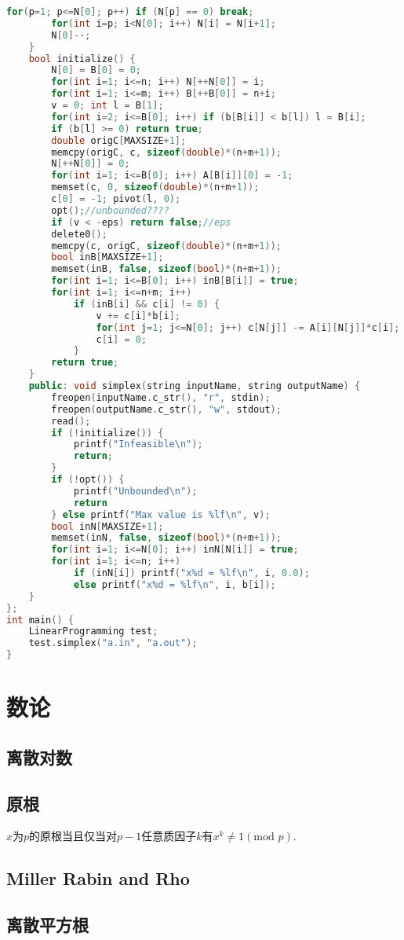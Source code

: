 \documentclass[landscape,a4paper]{article}
\begin{document}
\begin{spacing}{0.3}
\begin{multicols}{2}
\begin{lstlisting}[language=C++]
		for(p=1; p<=N[0]; p++) if (N[p] == 0) break;
		for(int i=p; i<N[0]; i++) N[i] = N[i+1];
		N[0]--;
	}
	bool initialize() {
		N[0] = B[0] = 0;
		for(int i=1; i<=n; i++) N[++N[0]] = i;
		for(int i=1; i<=m; i++) B[++B[0]] = n+i;
		v = 0; int l = B[1];
		for(int i=2; i<=B[0]; i++) if (b[B[i]] < b[l]) l = B[i];
		if (b[l] >= 0) return true;
		double origC[MAXSIZE+1];
		memcpy(origC, c, sizeof(double)*(n+m+1));
		N[++N[0]] = 0;
		for(int i=1; i<=B[0]; i++) A[B[i]][0] = -1;
		memset(c, 0, sizeof(double)*(n+m+1));
		c[0] = -1; pivot(l, 0);
		opt();//unbounded????
		if (v < -eps) return false;//eps
		delete0();
		memcpy(c, origC, sizeof(double)*(n+m+1));
		bool inB[MAXSIZE+1];
		memset(inB, false, sizeof(bool)*(n+m+1));
		for(int i=1; i<=B[0]; i++) inB[B[i]] = true;
		for(int i=1; i<=n+m; i++)
			if (inB[i] && c[i] != 0) {
				v += c[i]*b[i];
				for(int j=1; j<=N[0]; j++) c[N[j]] -= A[i][N[j]]*c[i];
				c[i] = 0;
			}
		return true;
	}
	public: void simplex(string inputName, string outputName) {
		freopen(inputName.c_str(), "r", stdin);
		freopen(outputName.c_str(), "w", stdout);
		read();
		if (!initialize()) {
			printf("Infeasible\n");
			return;
		}
		if (!opt()) {
			printf("Unbounded\n");
			return
		} else printf("Max value is %lf\n", v);
		bool inN[MAXSIZE+1];
		memset(inN, false, sizeof(bool)*(n+m+1));
		for(int i=1; i<=N[0]; i++) inN[N[i]] = true;
		for(int i=1; i<=n; i++)
			if (inN[i]) printf("x%d = %lf\n", i, 0.0);
			else printf("x%d = %lf\n", i, b[i]);
	}
};
int main() {
	LinearProgramming test;
	test.simplex("a.in", "a.out");
}
\end{lstlisting}	
	
	\section{数论}
	\subsection{离散对数}
	
	\subsection{原根}
	$x$为$p$的原根当且仅当对$p-1$任意质因子$k$有$x^{k}\neq 1(\text{mod } p)$.
	\subsection{Miller Rabin and Rho}
	
	\subsection{离散平方根}
	

\end{multicols}
\end{spacing}
\end{document}
